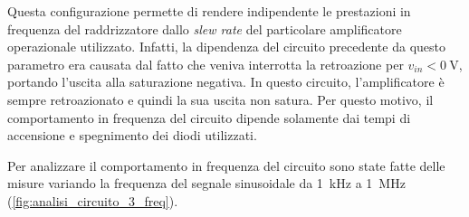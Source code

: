 \clearpage
\noindent
Questa configurazione permette di rendere indipendente le prestazioni in frequenza del raddrizzatore dallo \textit{slew rate} del particolare amplificatore operazionale utilizzato. Infatti, la dipendenza del circuito precedente da questo parametro era causata dal fatto che veniva interrotta la retroazione per $v_{in}<\SI{0}{\volt}$, portando l'uscita alla saturazione negativa. In questo circuito, l'amplificatore è sempre retroazionato e quindi la sua uscita non satura. Per questo motivo, il comportamento in frequenza del circuito dipende solamente dai tempi di accensione e spegnimento dei diodi utilizzati. 

\noindent
Per analizzare il comportamento in frequenza del circuito sono state fatte delle misure variando la frequenza del segnale sinusoidale da \SI{1}{\kilo\hertz} a \SI{1}{\mega\hertz} (\Fig\ref{fig:analisi_circuito_3_freq}).
